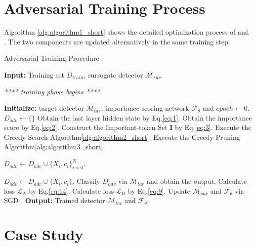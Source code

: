 \section{Adversarial Training Process}
\label{appd: pseudo}
Algorithm \ref{alg:algorithm1_short} shows the detailed optimization process of \attackname and . The two components are updated alternatively in the same training step.

\begin{algorithm}[h]
\small
\caption{Adversarial Training Procedure}
\label{alg:algorithm1_short}
\begin{algorithmic}[1]
        \State \textbf{Input:} Training set $D_{train}$, surrogate detector $\mathcal{M}_{sur}$.

    \begin{center}
            \textit{**** training phase begins ****}
        \end{center}
    \State \textbf{Initialize:} target detector $\mathcal{M}_{tar}$, importance scoring network $\mathcal{F}_{\theta}$ and $epoch \leftarrow 0$.
       \State $D_{adv}\leftarrow \{\}$
       \State Obtain the last layer hidden state by Eq.\eqref{eq:1}.
       \State Obtain the importance score by Eq.\eqref{eq:2}.
       \State Construct the Important-token Set $\mathbf{I}$ by Eq.\eqref{eq:3}.
       \State Execute the Greedy Search Algorithm\ref{alg:algorithm2_short}.
       \State Execute the Greedy Pruning Algorithm\ref{alg:algorithm3_short}.
       \begin{center}
            $D_{adv} \gets D_{adv} \cup \{X_i, c_i\}_{i=0}^{N}$.
        \end{center}
       \EndFor
       \State $D_{adv} \gets D_{adv} \cup \{\tilde{X}_i, c_i\}$.
       \State Classify $D_{adv}$ via $\mathcal{M}_{tar}$ and obtain the output.
       \State Calculate loss $\mathcal{L}_{\text{A}}$ by Eq.\eqref{eq:14}.
       \State Calculate loss $\mathcal{L}_{\text{D}}$ by Eq.\eqref{eq:9}.
       \State Update $\mathcal{M}_{sar}$ and $\mathcal{F}_{\theta}$ via SGD .
       \EndFor 
    \EndWhile
    \State \textbf{Output:} Trained detector $\mathcal{M}_{tar}$ and $\mathcal{F}_{\theta}$.
\end{algorithmic}
\end{algorithm}


\section{Case Study}

